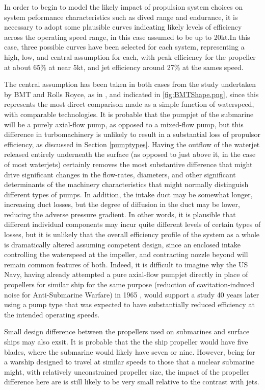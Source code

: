 \documentclass{article}\usepackage[]{graphicx}\usepackage[]{color}
\begin{document}
In order to begin to model the likely impact of propulsion system choices on system peformance characteristics such as dived range and endurance, it is necessary to adopt some plausible curves indicating likely levels of efficiency across the operating speed range, in this case assumed to be up to 20kt.In this case, three possible curves have been selected for each system, representing a high, low, and central assumption for each, with peak efficiency for the propeller at about 65\% at near 5kt, and jet efficiency around 27\% at the sames speed.

The central assumption has been taken in both cases from the study undertaken by BMT and Rolls Royce, as in \cite{giles2010}, and indicated in \ref{fig:BMTShape.png}, since this represents the most direct comparison made as a simple function of waterspeed, with comparable technologies. It is probable that the pumpjet of the submarine will be a purely axial-flow pump, as opposed to a mixed-flow pump, but this difference in turbomachinery is unlikely to result in a substantial loss of propulsor efficiency, as discussed in Section \ref{pumptypes}. Having the outflow of the waterjet released entirely underneath the surface (as opposed to just above it, in the case of most waterjets) certainly removes the most substantive difference that might drive significant changes in the flow-rates, diameters, and other significant determinants of the machinery characteristics that might normally distinguish different types of pumps.  In addition, the intake duct may be somewhat longer, increasing duct losses, but the degree of diffusion in the duct may be lower, reducing the adverse pressure gradient.  In other words, it is plausible that different individual components may incur quite different levels of certain types of losses, but it is unlikely that the overall efficiency profile of the system as a whole is dramatically altered assuming competent design, since an enclosed intake controlling the waterspeed at the impeller, and contracting nozzle beyond will remain common features of both. Indeed, it is difficult to imagine why the US Navy, having already attempted a pure axial-flow pumpjet directly in place of propellers for similar ship for the same purpose (reduction of cavitation-induced noise for Anti-Submarine Warfare) in 1965 \parencite{harvie1965construction}, would support a study 40 years later using a pump type that was expected to have substantially reduced efficiency at the intended operating speeds.

Small design difference between the propellers used on submarines and surface ships may also exsit. It is probable that the the ship propeller would have five blades, where the submarine would likely have seven or nine. However, being for a warship designed to travel at similar speeds to those that a nuclear submarine might, with relatively unconstrained propeller size, the impact of the propeller difference here are is still likely to be very small relative to the contrast with jets.
\end{document}
